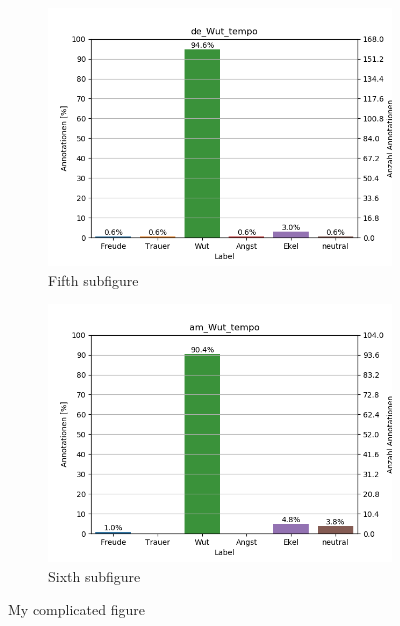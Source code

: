 \documentclass[11pt,a4paper,headsepline,twoside,toc=bibliography]{scrreprt}
\begin{document}
\begin{figure}[t!]
	\medskip
	\begin{subfigure}{0.48\textwidth}
		\includegraphics[width=\linewidth]{plots/de_Wut_tempo.png}
		\caption{Fifth subfigure} \label{fig:de_W_tempo}
	\end{subfigure}\hspace*{\fill}
	\begin{subfigure}{0.48\textwidth}
		\includegraphics[width=\linewidth]{plots/am_Wut_tempo.png}
		\caption{Sixth subfigure} \label{fig:am_W_tempo}
	\end{subfigure}
	
	\caption{My complicated figure} \label{fig:countplots_W}
\end{figure}
\end{document}
